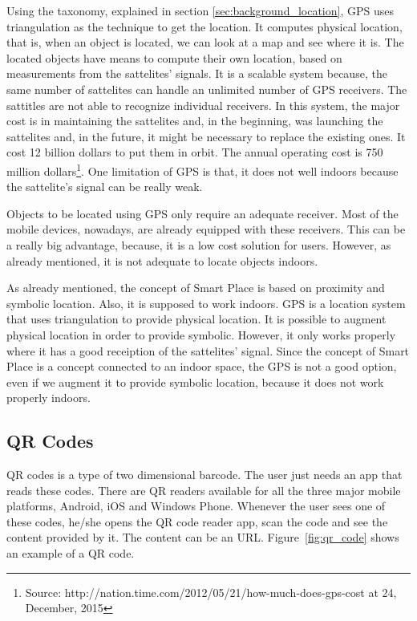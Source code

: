 Using the taxonomy, explained in section \ref{sec:background_location}, \gls{GPS} uses triangulation as the technique to get the location.
It computes physical location, that is, when an object is located, we can look at a map and see where it is.
The located objects have means to compute their own location, based on measurements from the sattelites' signals.
It is a scalable system because, the same number of sattelites can handle an unlimited number of \gls{GPS} receivers.
The sattitles are not able to recognize individual receivers.
In this system, the major cost is in maintaining the sattelites and, in the beginning, was launching the sattelites and, in the future, it might be necessary to replace the existing ones.
It cost 12 billion dollars to put them in orbit. The annual operating cost is 750 million dollars\footnote{Source: http://nation.time.com/2012/05/21/how-much-does-gps-cost at 24, December, 2015}.
One limitation of \gls{GPS} is that, it does not well indoors because the sattelite's signal can be really weak.

Objects to be located using \gls{GPS} only require an adequate receiver. Most of the mobile devices, nowadays, are already equipped with these receivers.
This can be a really big advantage, because, it is a low cost solution for users.
However, as already mentioned, it is not adequate to locate objects indoors.

As already mentioned, the concept of Smart Place is based on proximity and symbolic location.
Also, it is supposed to work indoors.
\gls{GPS} is a location system that uses triangulation to provide physical location.
It is possible to augment physical location in order to provide symbolic.
However, it only works properly where it has a good receiption of the sattelites' signal.
Since the concept of Smart Place is a concept connected to an indoor space, the \gls{GPS} is not a good option, even if we augment it to provide symbolic location, because it does not work properly indoors.

\subsection{QR Codes}
\label{sub:background_qr_codes}
\gls{QR} codes is a type of two dimensional barcode.
The user just needs an app that reads these codes.
There are \gls{QR} readers available for all the three major mobile platforms, Android, iOS and Windows Phone.
Whenever the user sees one of these codes, he/she opens the \gls{QR} code reader app, scan the code and see the content provided by it.
The content can be an \gls{URL}.
Figure~\ref{fig:qr_code} shows an example of a \gls{QR} code.


